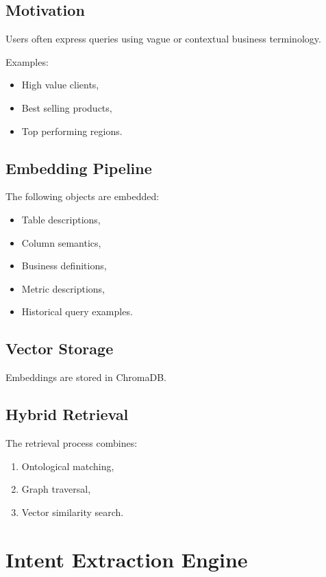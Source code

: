 \documentclass[11pt,a4paper]{article}
\begin{document}
\subsection{Motivation}

Users often express queries using vague or contextual business terminology.

Examples:
\begin{itemize}
    \item High value clients,
    \item Best selling products,
    \item Top performing regions.
\end{itemize}

\subsection{Embedding Pipeline}

The following objects are embedded:
\begin{itemize}
    \item Table descriptions,
    \item Column semantics,
    \item Business definitions,
    \item Metric descriptions,
    \item Historical query examples.
\end{itemize}

\subsection{Vector Storage}

Embeddings are stored in ChromaDB.

\subsection{Hybrid Retrieval}

The retrieval process combines:
\begin{enumerate}
    \item Ontological matching,
    \item Graph traversal,
    \item Vector similarity search.
\end{enumerate}

\section{Intent Extraction Engine}
\end{document}

